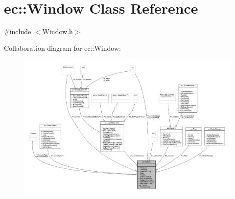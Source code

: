 \hypertarget{classec_1_1_window}{}\section{ec\+:\+:Window Class Reference}
\label{classec_1_1_window}


{\ttfamily \#include $<$Window.\+h$>$}



Collaboration diagram for ec\+:\+:Window\+:\nopagebreak
\begin{figure}[H]
\begin{center}
\leavevmode
\includegraphics[width=350pt]{classec_1_1_window__coll__graph}
\end{center}
\end{figure}
